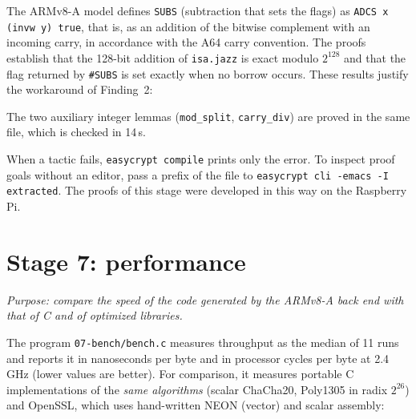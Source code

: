 \documentclass[11pt,a4paper]{article}
\newcommand{\cmd}[1]{\lstinline[style=shell,frame=none]{#1}}
\newcommand{\file}[1]{\texttt{#1}}
\begin{document}
The ARMv8-A model defines \texttt{SUBS} (subtraction that sets the flags)
as \texttt{ADCS x (invw y) true}, that is, as an addition of the bitwise
complement with an incoming carry, in accordance with the A64 carry
convention. The proofs establish that the 128-bit addition of
\file{isa.jazz} is exact modulo $2^{128}$ and that the flag returned by
\texttt{\#SUBS} is set exactly when no borrow occurs. These results justify
the workaround of Finding~2:



The two auxiliary integer lemmas (\texttt{mod\_split}, \texttt{carry\_div})
are proved in the same file, which is checked in 14\,s.

\begin{note}
When a tactic fails, \texttt{easycrypt compile} prints only the error. To
inspect proof goals without an editor, pass a prefix of the file to
\cmd{easycrypt cli -emacs -I extracted}. The proofs of this stage were
developed in this way on the Raspberry Pi.
\end{note}

\section{Stage 7: performance}

\emph{Purpose: compare the speed of the code generated by the ARMv8-A back
end with that of C and of optimized libraries.}

The program \file{07-bench/bench.c} measures throughput as the median of
11 runs and reports it in nanoseconds per byte and in processor cycles per
byte at 2.4\,GHz (lower values are better). For comparison, it measures
portable C implementations of the \emph{same algorithms} (scalar ChaCha20,
Poly1305 in radix $2^{26}$) and OpenSSL, which uses hand-written NEON
(vector) and scalar assembly:
\end{document}
